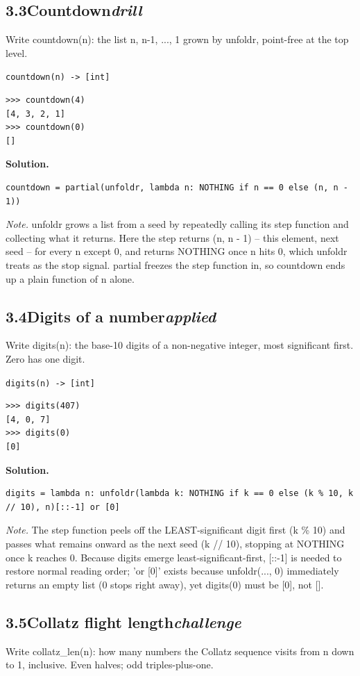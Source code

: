 \documentclass[10pt,letterpaper]{book}
\begin{document}
\subsection*{3.3\quad Countdown\hfill\textnormal{\textit{drill}}}
Write countdown(n): the list n, n-1, ..., 1 grown by unfoldr, point-free at the top level.

\noindent\texttt{countdown(n) -> [int]}
\begin{lstlisting}[style=ex]
>>> countdown(4)
[4, 3, 2, 1]
>>> countdown(0)
[]
\end{lstlisting}
\noindent\textbf{Solution.}
\begin{lstlisting}[style=code]
countdown = partial(unfoldr, lambda n: NOTHING if n == 0 else (n, n - 1))
\end{lstlisting}
\noindent\textit{Note.} unfoldr grows a list from a seed by repeatedly calling its step function and collecting what it returns. Here the step returns (n, n - 1) -- this element, next seed -- for every n except 0, and returns NOTHING once n hits 0, which unfoldr treats as the stop signal. partial freezes the step function in, so countdown ends up a plain function of n alone.

\subsection*{3.4\quad Digits of a number\hfill\textnormal{\textit{applied}}}
Write digits(n): the base-10 digits of a non-negative integer, most significant first. Zero has one digit.

\noindent\texttt{digits(n) -> [int]}
\begin{lstlisting}[style=ex]
>>> digits(407)
[4, 0, 7]
>>> digits(0)
[0]
\end{lstlisting}
\noindent\textbf{Solution.}
\begin{lstlisting}[style=code]
digits = lambda n: unfoldr(lambda k: NOTHING if k == 0 else (k % 10, k // 10), n)[::-1] or [0]
\end{lstlisting}
\noindent\textit{Note.} The step function peels off the LEAST-significant digit first (k \% 10) and passes what remains onward as the next seed (k // 10), stopping at NOTHING once k reaches 0. Because digits emerge least-significant-first, [::-1] is needed to restore normal reading order; 'or [0]' exists because unfoldr(..., 0) immediately returns an empty list (0 stops right away), yet digits(0) must be [0], not [].

\subsection*{3.5\quad Collatz flight length\hfill\textnormal{\textit{challenge}}}
Write collatz\_len(n): how many numbers the Collatz sequence visits from n down to 1, inclusive. Even halves; odd triples-plus-one.
\end{document}
